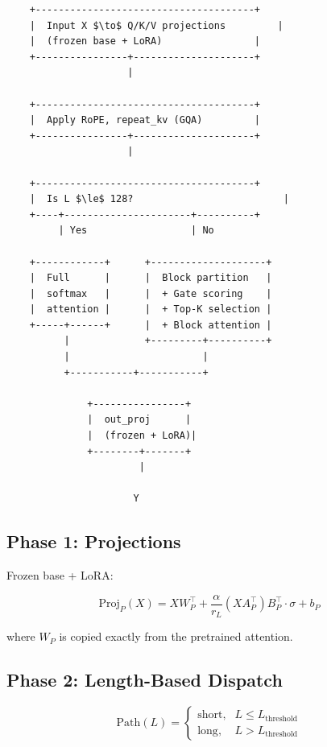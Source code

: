 \begin{lstlisting}
    +--------------------------------------+
    |  Input X $\to$ Q/K/V projections         |
    |  (frozen base + LoRA)                |
    +----------------+---------------------+
                     |
                      
    +--------------------------------------+
    |  Apply RoPE, repeat_kv (GQA)         |
    +----------------+---------------------+
                     |
                      
    +--------------------------------------+
    |  Is L $\le$ 128?                          |
    +----+----------------------+----------+
         | Yes                  | No
                                 
    +------------+      +--------------------+
    |  Full      |      |  Block partition   |
    |  softmax   |      |  + Gate scoring    |
    |  attention |      |  + Top-K selection |
    +-----+------+      |  + Block attention |
          |             +---------+----------+
          |                       |
          +-----------+-----------+
                       
              +----------------+
              |  out_proj      |
              |  (frozen + LoRA)|
              +--------+-------+
                       |
                        
                      Y
\end{lstlisting}

\subsection{Phase 1: Projections}

Frozen base + LoRA:

\[
\text{Proj}_P(X) = X W_P^\top + \frac{\alpha}{r_L} (X A_P^\top) B_P^\top \cdot \sigma + b_P
\tag{4.1}
\]

where $W_P$ is copied exactly from the pretrained attention.

\subsection{Phase 2: Length-Based Dispatch}

\[
\text{Path}(L) = \begin{cases}
\text{short}, & L \leq L_\text{threshold} \\
\text{long}, & L > L_\text{threshold}
\end{cases}
\tag{4.2}
\]

